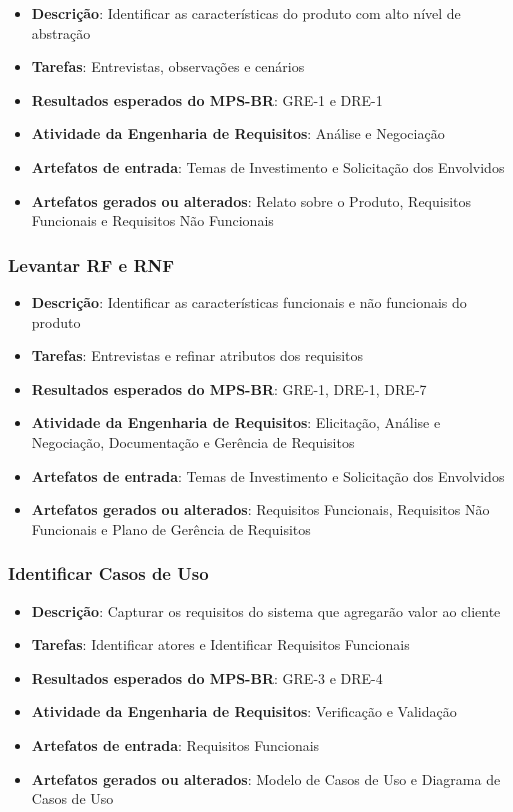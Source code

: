 \begin{itemize}
\item \textbf{Descrição}: Identificar as características do produto com alto nível de abstração
\item \textbf{Tarefas}: Entrevistas, observações e cenários
\item \textbf{Resultados esperados do MPS-BR}: GRE-1 e DRE-1
\item \textbf{Atividade da Engenharia de Requisitos}: Análise e Negociação
\item \textbf{Artefatos de entrada}: Temas de Investimento e Solicitação dos Envolvidos
\item \textbf{Artefatos gerados ou alterados}: Relato sobre o Produto, Requisitos Funcionais e Requisitos Não Funcionais
\end{itemize}

\subsubsection{Levantar RF e RNF}

\begin{itemize}
\item \textbf{Descrição}: Identificar as características funcionais e não funcionais do produto
\item \textbf{Tarefas}: Entrevistas e refinar atributos dos requisitos
\item \textbf{Resultados esperados do MPS-BR}: GRE-1, DRE-1, DRE-7
\item \textbf{Atividade da Engenharia de Requisitos}:  Elicitação, Análise e Negociação, Documentação e Gerência de Requisitos
\item \textbf{Artefatos de entrada}: Temas de Investimento e Solicitação dos Envolvidos
\item \textbf{Artefatos gerados ou alterados}: Requisitos Funcionais, Requisitos Não Funcionais e Plano de Gerência de Requisitos
\end{itemize}

\subsubsection{Identificar Casos de Uso}

\begin{itemize}
\item \textbf{Descrição}: Capturar os requisitos do sistema que agregarão valor ao cliente
\item \textbf{Tarefas}: Identificar atores e Identificar Requisitos Funcionais
\item \textbf{Resultados esperados do MPS-BR}: GRE-3 e DRE-4
\item \textbf{Atividade da Engenharia de Requisitos}: Verificação e Validação
\item \textbf{Artefatos de entrada}: Requisitos Funcionais
\item \textbf{Artefatos gerados ou alterados}: Modelo de Casos de Uso e Diagrama de Casos de Uso
\end{itemize}

